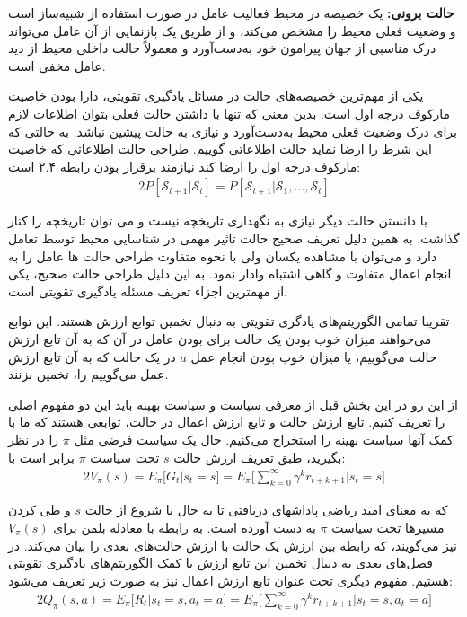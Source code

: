  \textbf{حالت برونی:} یک خصیصه در محیط فعالیت عامل در صورت استفاده از شبیه‌ساز است و وضعیت فعلی محیط را مشخص می‌کند، و از طریق یک بازنمایی از آن عامل می‌تواند درک مناسبی از جهان پیرامون خود به‌دست‌آورد و معمولاً حالت داخلی محیط از دید عامل مخفی است.



یکی از مهم‌ترین خصیصه‌های حالت در مسائل یادگیری تقویتی، دارا بودن خاصیت مارکوف درجه اول است. بدین معنی که تنها با داشتن حالت فعلی بتوان اطلاعات لازم برای درک وضعیت فعلی محیط به‌دست‌آورد و نیازی به حالت پیشین نباشد. به حالتی که این شرط را ارضا نماید حالت اطلاعاتی ‌گوییم. طراحی حالت اطلاعاتی که خاصیت مارکوف درجه اول را ارضا کند نیازمند برقرار بودن رابطه ۲.۴ است:
\begin{alignat}{2}
	P[\mathcal{S}_{t+1}|\mathcal{S}_t] = P[\mathcal{S}_{t+1}|\mathcal{S}_{1}, \ldots, \mathcal{S}_t]
	\label{103}  
\end{alignat}  


 با دانستن حالت دیگر نیازی به نگهداری تاریخچه نیست و می توان تاریخچه را کنار گذاشت. به همین دلیل تعریف صحیح حالت تاثیر مهمی در شناسایی محیط توسط تعامل دارد و می‌توان با مشاهده یکسان ولی با نحوه متفاوت طراحی حالت ها عامل را به انجام اعمال متفاوت و گاهی اشتباه وادار نمود. به این دلیل طراحی حالت صحیح، یکی از مهمترین اجزاء تعریف مسئله یادگیری تقویتی است.



تقریبا تمامی الگوریتم‌های یادگری تقویتی به دنبال تخمین توابع ارزش هستند. این توابع می‌خواهند میزان خوب بودن یک حالت برای بودن عامل در آن که به آن تابع ارزش حالت می‌گوییم، یا میزان خوب بودن انجام عمل $a$ در یک حالت که به آن تابع ارزش عمل می‌گوییم را، تخمین بزنند.

از این رو در این بخش قبل از معرفی سیاست و سیاست بهینه باید این دو مفهوم اصلی را تعریف کنیم. تابع ارزش حالت و تابع ارزش اعمال در حالت، توابعی هستند که ما با کمک آنها سیاست بهینه را استخراج می‌کنیم. حال یک سیاست فرضی مثل $\pi$ را در نظر بگیرید، طبق تعریف ارزش حالت $s$ تحت سیاست $\pi$ برابر است با:
\begin{alignat}{2}
	V_\pi(s) = E_\pi \big[G_t | s_t = s \big] = E_\pi \bigg[ \sum\limits_{k=0}^\infty \gamma^{k} r_{t+k+1} \big| s_t = s \bigg]
	\label{1000}  
\end{alignat}  


که به معنای امید ریاضی پاداشهای دریافتی تا به حال با شروع از حالت $s$ و طی کردن مسیرها تحت سیاست $\pi$ به دست آورده است. به رابطه با معادله بلمن برای $V_\pi(s)$ نیز می‌گویند، که رابطه بین ارزش یک حالت با ارزش حالت‌های بعدی را بیان می‌کند. در فصل‌های بعدی به دنبال تخمین این تابع ارزش با کمک الگوریتم‌های یادگیری تقویتی هستیم. مفهوم دیگری تحت عنوان تابع ارزش اعمال نیز به صورت زیر تعریف می‌شود:
\begin{alignat}{2}
	Q_\pi(s,a) = E_\pi \big[R_t | s_t = s, a_t = a \big] = E_\pi \bigg[ \sum\limits_{k=0}^\infty \gamma^{k} r_{t+k+1} \big| s_t = s, a_t = a \bigg]
	\label{1001}  
\end{alignat}  


